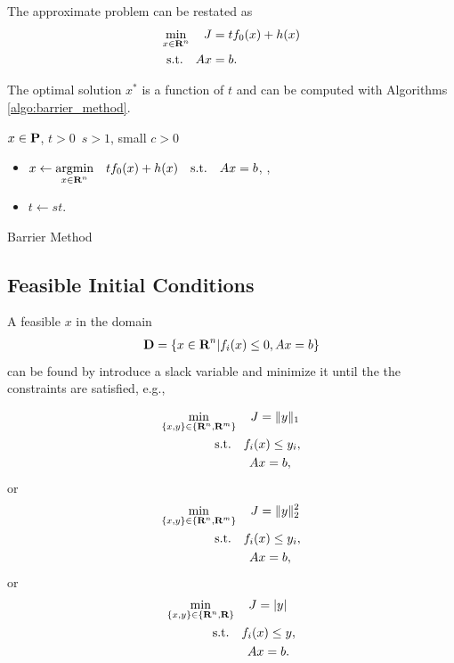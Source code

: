 \documentclass{article}
\begin{document}
    The approximate problem can be restated as
    \begin{align*}
        \min_{x\in\textbf{R}^n}\quad J&=tf_0(x)+h(x)\\
        \text{s.t.}\quad A x &= b.
    \end{align*}

    The optimal solution $x^*$ is a function of $t$ and can be computed with
    Algorithms \ref{algo:barrier_method}.

    \begin{algorithm}[H]
        \SetAlgoLined
        $x \in\textbf{P}$, $t>0$\, $s>1$, small $c>0$ \\
        {
            \begin{itemize}
                \item $x\leftarrow \underset{x\in\textbf{R}^n}{\text{argmin}} \quad tf_0(x)+h(x)\quad \text{s.t.}\quad Ax=b$,
                \quad{},
                \item $t\leftarrow s t$.
            \end{itemize}
        }
    \caption{Barrier Method}
    \label{algo:barrier_method}
    \end{algorithm}

    \clearpage
\subsection{Feasible Initial Conditions}

A feasible $x$ in the domain
\begin{align*}
    \textbf{D}=\{x\in\textbf{R}^n | f_i(x)\leq 0, A x =b\}
\end{align*}
can be found by introduce a slack variable and minimize it until
the the constraints are satisfied, e.g., 

    \begin{align*}
        \min_{\{x,y\}\in\{\textbf{R}^n,\textbf{R}^m\}}\quad J &= \|y\|_1\\
        \text{s.t.}\quad f_i(&x)\leq y_i,\\
        A &x =b,
    \end{align*}
or
    \begin{align*}
        \min_{\{x,y\}\in\{\textbf{R}^n,\textbf{R}^m\}}\quad J &= \|y\|_2^2\\
        \text{s.t.}\quad f_i(&x)\leq y_i,\\
        A &x =b,
    \end{align*}
or
    \begin{align*}
        \min_{\{x,y\}\in\{\textbf{R}^{n},\textbf{R}\}}\quad J &= |y|\\
        \text{s.t.}\quad f_i(&x)\leq y,\\
        A &x =b.
    \end{align*}
\end{document}
